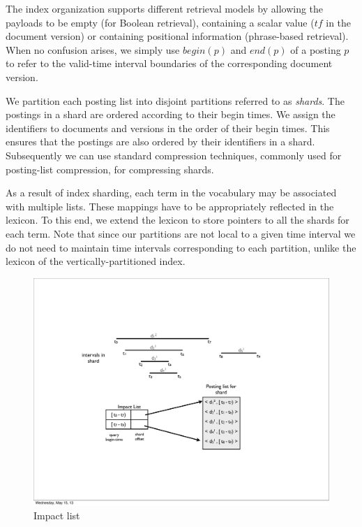 The index organization supports different retrieval models by allowing the
payloads to be empty (for Boolean retrieval), containing a scalar value ($tf$ in the document
version) or containing positional information (phrase-based retrieval). When no confusion
arises, we simply use $begin(p)$ and $end(p)$ of a posting $p$ to
refer to the valid-time interval boundaries of the corresponding document version.

We partition each posting list into disjoint 
partitions referred to as \emph{shards}. The postings in a shard are ordered 
according to their begin times. We assign the identifiers to documents
and versions in the order of their begin times. This ensures that the postings are also
 ordered by their identifiers in a shard. Subsequently we can use standard compression 
  techniques, commonly used for posting-list compression, for compressing shards. 

As a result of index sharding, each term in the vocabulary may be associated
with multiple lists. These mappings have to be appropriately reflected in the lexicon. 
To this end, we extend the lexicon to store pointers 
to all the shards for each term. Note that since our partitions are not local to a given time interval we 
do not need to maintain time intervals corresponding to each partition, 
unlike the lexicon of the vertically-partitioned index.


\begin{figure}[tb]
	\centering
		\includegraphics[width=\textwidth]{resources/impact-list.pdf}
	\caption{Impact list}
	 \label{fig:impactlist}
\end{figure}


